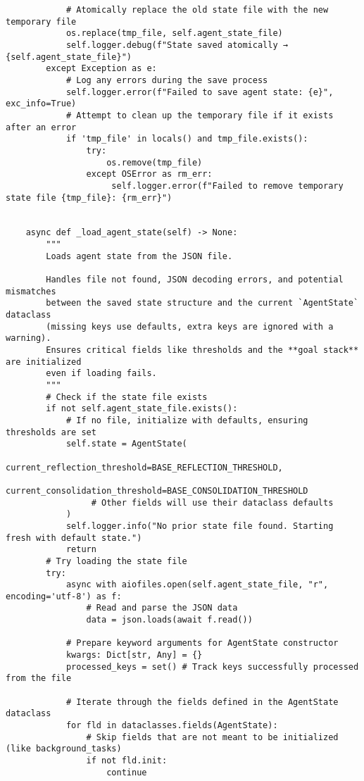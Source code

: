 \documentclass[12pt,a4paper]{article}
\begin{document}
\begin{pageablecode}
\begin{verbatim}
            # Atomically replace the old state file with the new temporary file
            os.replace(tmp_file, self.agent_state_file)
            self.logger.debug(f"State saved atomically → {self.agent_state_file}")
        except Exception as e:
            # Log any errors during the save process
            self.logger.error(f"Failed to save agent state: {e}", exc_info=True)
            # Attempt to clean up the temporary file if it exists after an error
            if 'tmp_file' in locals() and tmp_file.exists():
                try:
                    os.remove(tmp_file)
                except OSError as rm_err:
                     self.logger.error(f"Failed to remove temporary state file {tmp_file}: {rm_err}")


    async def _load_agent_state(self) -> None:
        """
        Loads agent state from the JSON file.

        Handles file not found, JSON decoding errors, and potential mismatches
        between the saved state structure and the current `AgentState` dataclass
        (missing keys use defaults, extra keys are ignored with a warning).
        Ensures critical fields like thresholds and the **goal stack** are initialized
        even if loading fails.
        """
        # Check if the state file exists
        if not self.agent_state_file.exists():
            # If no file, initialize with defaults, ensuring thresholds are set
            self.state = AgentState(
                 current_reflection_threshold=BASE_REFLECTION_THRESHOLD,
                 current_consolidation_threshold=BASE_CONSOLIDATION_THRESHOLD
                 # Other fields will use their dataclass defaults
            )
            self.logger.info("No prior state file found. Starting fresh with default state.")
            return
        # Try loading the state file
        try:
            async with aiofiles.open(self.agent_state_file, "r", encoding='utf-8') as f:
                # Read and parse the JSON data
                data = json.loads(await f.read())

            # Prepare keyword arguments for AgentState constructor
            kwargs: Dict[str, Any] = {}
            processed_keys = set() # Track keys successfully processed from the file

            # Iterate through the fields defined in the AgentState dataclass
            for fld in dataclasses.fields(AgentState):
                # Skip fields that are not meant to be initialized (like background_tasks)
                if not fld.init:
                    continue


\end{verbatim}
\end{pageablecode}
\end{document}
